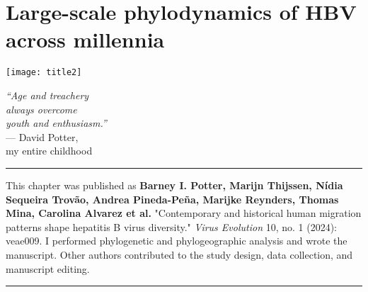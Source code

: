 \chapter{Large-scale phylodynamics of HBV across millennia}\label{ch:chapter3}

\begin{minipage}[b]{0.6\textwidth}
    \texttt{[image: title2]} %
  \end{minipage}
  \hfill
  \begin{minipage}[b]{0.35\textwidth}
    \footnotesize
    \begin{flushright}
      \textit{``Age and treachery\\always overcome\\youth and enthusiasm.''} \\
      --- David Potter, \\my entire childhood
    \end{flushright}
    \vspace{2cm}
  \end{minipage}

\clearpage


\singlespacing

\hrule
\vspace*{12pt}
This chapter was published as \textbf{Barney I. Potter, Marijn Thijssen, Nídia Sequeira Trovão, Andrea Pineda-Peña, Marijke Reynders, Thomas Mina, Carolina Alvarez et al.} "Contemporary and historical human migration patterns shape hepatitis B virus diversity." \textit{Virus Evolution} 10, no. 1 (2024): veae009.
I performed phylogenetic and phylogeographic analysis and wrote the manuscript.
Other authors contributed to the study design, data collection, and manuscript editing.
\vspace*{12pt}
\hrule

\onehalfspacing


